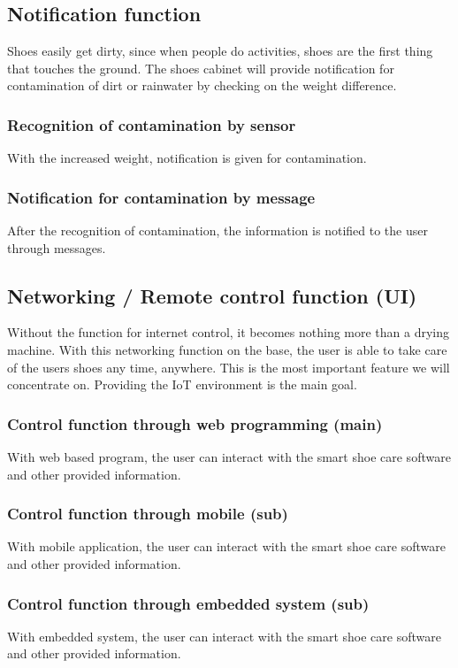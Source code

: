 \documentclass[conference]{IEEEtran}
\begin{document}
\subsection{Notification function}
Shoes easily get dirty, since when people do activities, shoes are the first thing that touches the ground. The shoes cabinet will provide notification for contamination of dirt or rainwater by checking on the weight difference.\\
\subsubsection{Recognition of contamination by sensor}
With the increased weight, notification is given for contamination.\\
\subsubsection{Notification for contamination by message}
After the recognition of contamination, the information is notified to the user through messages.\\


\subsection{Networking / Remote control function (UI)}
Without the function for internet control, it becomes nothing more than a drying machine. With this networking function on the base, the user is able to take care of the users shoes any time, anywhere. This is the most important feature we will concentrate on. Providing the IoT environment is the main goal. \\
\subsubsection{Control function through web programming (main)}
With web based program, the user can interact with the smart shoe care software and other provided information.\\
\subsubsection{Control function through mobile (sub)}
With mobile application, the user can interact with the smart shoe care software and other provided information.\\
\subsubsection{Control function through embedded system (sub)}
With embedded system, the user can interact with the smart shoe care software and other provided information.\\
\end{document}
